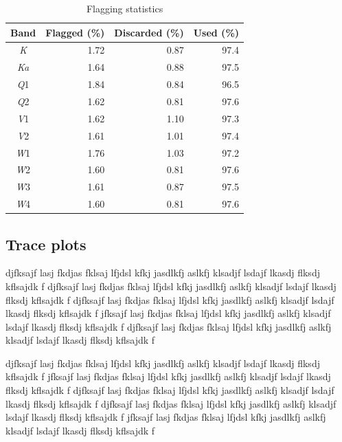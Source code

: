 \documentclass[twocolumn]{../../common/aa}
\newcommand{\K}[0]{\textit K}
\newcommand{\Ka}[0]{\textit{Ka}}
\newcommand{\Q}[0]{\textit Q}
\newcommand{\V}[0]{\textit V}
\newcommand{\W}[0]{\textit W}
\begin{document}
\begin{table}
\caption{Flagging statistics}              %
\label{table:flagged_data}      %
\centering                                      %
\begin{tabular}{c r r r}          %
\hline\hline                        %
	Band & Flagged (\%) & Discarded (\%) & Used (\%) \\    %
\hline                                   %
	\K  &  1.72 & 0.87 & 97.4\\
	\Ka &  1.64 & 0.88 & 97.5\\      %
	\Q1 &  1.84 & 0.84 & 96.5\\
	\Q2 &  1.62 & 0.81 & 97.6\\
	\V1 &  1.62 & 1.10 & 97.3\\
	\V2 &  1.61 & 1.01 & 97.4\\
	\W1 &  1.76 & 1.03 & 97.2\\
	\W2 &  1.60 & 0.81 & 97.6\\
	\W3 &  1.61 & 0.87 & 97.5\\
	\W4 &  1.60 & 0.81 & 97.6\\
\hline                                             %
\end{tabular}
\end{table}



\subsection{Trace plots}
\label{sec:traceplots}

djfksajf lasj fkdjas fklsaj lfjdsl kfkj jasdlkfj aslkfj klsadjf lsdajf lkasdj flksdj kflsajdk f
djfksajf lasj fkdjas fklsaj lfjdsl kfkj jasdlkfj aslkfj klsadjf lsdajf lkasdj flksdj kflsajdk f
djfksajf lasj fkdjas fklsaj lfjdsl kfkj jasdlkfj aslkfj klsadjf lsdajf lkasdj flksdj kflsajdk f
jfksajf lasj fkdjas fklsaj lfjdsl kfkj jasdlkfj aslkfj klsadjf lsdajf lkasdj flksdj kflsajdk f
djfksajf lasj fkdjas fklsaj lfjdsl kfkj jasdlkfj aslkfj klsadjf lsdajf lkasdj flksdj kflsajdk f

djfksajf lasj fkdjas fklsaj lfjdsl kfkj jasdlkfj aslkfj klsadjf lsdajf lkasdj flksdj kflsajdk f
jfksajf lasj fkdjas fklsaj lfjdsl kfkj jasdlkfj aslkfj klsadjf lsdajf lkasdj flksdj kflsajdk f
djfksajf lasj fkdjas fklsaj lfjdsl kfkj jasdlkfj aslkfj klsadjf lsdajf lkasdj flksdj kflsajdk f
djfksajf lasj fkdjas fklsaj lfjdsl kfkj jasdlkfj aslkfj klsadjf lsdajf lkasdj flksdj kflsajdk f
jfksajf lasj fkdjas fklsaj lfjdsl kfkj jasdlkfj aslkfj klsadjf lsdajf lkasdj flksdj kflsajdk f
\end{document}
